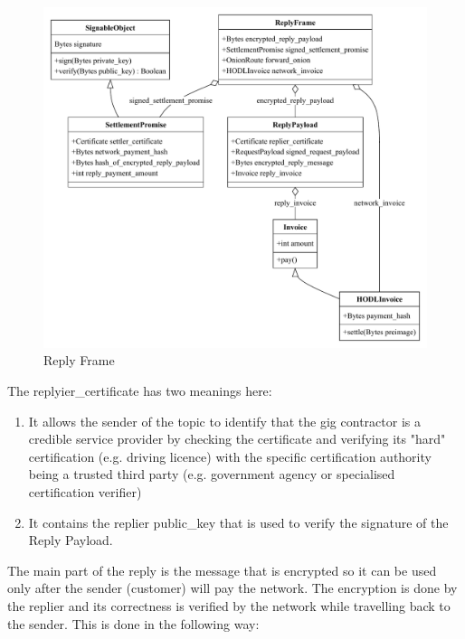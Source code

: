 \documentclass{article}
\begin{document}
\begin{figure}
	\centering
	\includegraphics[scale=0.7]{ReplyFrame.pdf}
	\caption{Reply Frame}
	\label{fig:fr:replyframe}
\end{figure}

The replyier\_certificate has two meanings here:

\begin{enumerate}
	\item It allows the sender of the topic to identify that the gig contractor is a credible service provider by checking the certificate and verifying its "hard" certification (e.g. driving licence) with the specific certification authority being a trusted third party (e.g. government agency or specialised certification verifier)
	\item It contains the replier public\_key that is used to verify the signature of the Reply Payload.
\end{enumerate}

The main part of the reply is the message that is encrypted so it can be used only after the sender (customer) will pay the network. The encryption is done by the replier and its correctness is verified by the network while travelling back to the sender. This is done in the following way:
\end{document}
